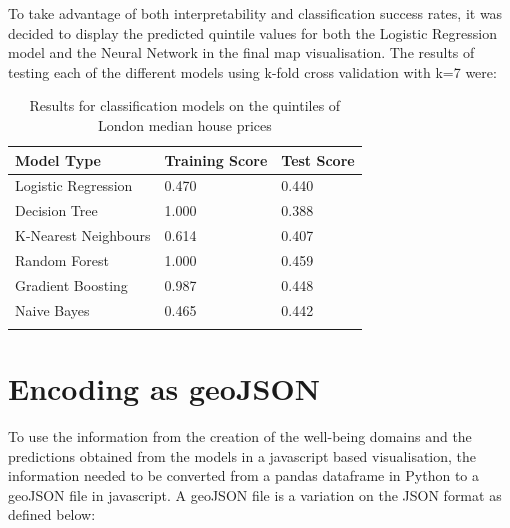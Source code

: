 To take advantage of both interpretability and classification success rates, it was decided to display the predicted quintile values for both the Logistic Regression model and the Neural Network in the final map visualisation. 
The results of testing each of the different models using k-fold cross validation with k=7 were:

\begin{table}
\caption{Results for classification models on the quintiles of London median house prices}
\centering
\begin{tabular}{lll}
\toprule
Model Type           & Training Score & Test Score \\
\midrule
Logistic Regression  & 0.470          & 0.440      \\
Decision Tree        & 1.000          & 0.388      \\
K-Nearest Neighbours & 0.614          & 0.407      \\
Random Forest        & 1.000          & 0.459      \\
Gradient Boosting    & 0.987          & 0.448      \\
Naive Bayes          & 0.465          & 0.442   \\  
\bottomrule\\
\end{tabular}
\end{table}


\section{Encoding as geoJSON}

To use the information from the creation of the well-being domains and the predictions obtained from the models in a javascript based visualisation, the information needed to be converted from a pandas dataframe in Python to a geoJSON file in javascript. A geoJSON file is a variation on the JSON format as defined below:

